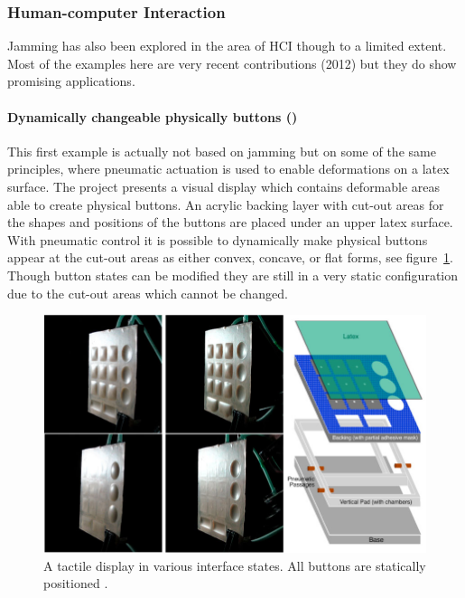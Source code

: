 \subsubsection{Human-computer Interaction}
\label{ch:jamming:related-work:hci}
Jamming has also been explored in the area of HCI though to a limited extent.
Most of the examples here are very recent contributions (2012) but they do show promising applications.

\paragraph{Dynamically changeable physically buttons (\citeyear{harrison2009providing})} 
\label{ch:jamming:related-work:hci:dynbuttons}
This first example is actually not based on jamming but on some of the same principles, where pneumatic actuation is used to enable deformations on a latex surface.
The project presents a visual display which contains deformable areas able to create physical buttons.
An acrylic backing layer with cut-out areas for the shapes and positions of the buttons are placed under an upper latex surface.
With pneumatic control it is possible to dynamically make physical buttons appear at the cut-out areas as either convex, concave, or flat forms, see figure~\ref{fig:ch:jamming:concepts:harrisonhudson}.
Though button states can be modified they are still in a very static configuration due to the cut-out areas which cannot be changed.

\begin{figure}[h]
  \centering
      \includegraphics[width=.9\textwidth]{figures/jamming/harrisonhudson}
  \caption{A tactile display in various interface states. All buttons are statically positioned \citep{harrison2009providing}.}
  \label{fig:ch:jamming:concepts:harrisonhudson}
\end{figure}

